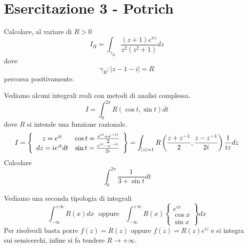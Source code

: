 \chapter{Esercitazione 3 - Potrich}

\ParteEsercizi

\Esercizio{}

Calcolare, al variare di $R > 0$
\begin{equation*}
I_{R} = \int_{\gamma_{R}}\frac{\left(z + 1\right) e^{\pi z}}{z^{2}\left(z^{2} + 1\right)} dz
\end{equation*}
dove
\begin{equation*}
\gamma_{R} :\left| z - 1 - i\right| = R
\end{equation*}
percorsa positivamente.

\Esercizio{}

Vediamo alcuni integrali reali con metodi di analisi complessa.
\begin{equation*}
I = \boxed{\int^{2\pi}_{0} R\left(\cos t, \sin t\right) dt}
\end{equation*}
dove $R$ si intende una funzione razionale.
\begin{equation*}
I = \left\{
\begin{array}{c c}
z = e^{it} & \cos t = \frac{e^{it} + e^{- it}}{2}\\
dz = ie^{it} dt & \sin t = \frac{e^{it} - e^{- it}}{2i}
\end{array}\right\} = \int_{\left| z\right| = 1} R\left(\frac{z + z^{- 1}}{2}, \frac{z - z^{- 1}}{2i}\right)\frac{1}{iz} dz
\end{equation*}
Calcolare
\begin{equation*}
\int^{2\pi}_{0}\frac{1}{3 + \sin t} dt
\end{equation*}

\Esercizio{}

Vediamo una seconda tipologia di integrali
\begin{equation*}
\boxed{\int^{+ \infty}_{- \infty} R(x) dx} \ \ \ \text{oppure} \ \ \ \ \boxed{\int^{+ \infty}_{- \infty} R(x)\left\{
\begin{array}{c}
e^{ix}\\
\cos x\\
\sin x
\end{array}\right\} dx}
\end{equation*}
Per risolverli basta porre $f(z) = R(z)$ oppure $f(z) = R(z) e^{iz}$ e si integra sui semicerchi, infine si fa tendere $R\rightarrow + \infty $.

